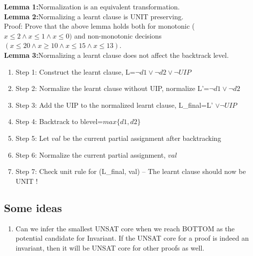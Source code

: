 \documentclass[a4paper,conference]{llncs}
\begin{document}
\textbf{Lemma 1:}Normalization is an equivalent transformation. \\ 
\textbf{Lemma 2:}Normalizing a learnt clause is UNIT preserving. \\
Proof: Prove that the above lemma holds both for monotonic ($x \leq 2 \land x \leq 1 
\land x \leq 0)$ and non-monotonic decisions $(x \leq 20 \land x \geq 10 \land
x \leq 15 \land x \leq 13)$. \\
\textbf{Lemma 3:}Normalizing a learnt clause does not affect the backtrack
level. \\
\begin{enumerate}
\item Step 1: Construct the learnt clause, L=${\neg{d1} \lor \neg{d2} \lor \neg{UIP}}$
\item Step 2: Normalize the learnt clause without UIP, normalize L'=${\neg{d1} \lor \neg{d2}}$
\item Step 3: Add the UIP to the normalized learnt clause, L\_final=L' $\lor \neg{UIP}$
\item Step 4: Backtrack to blevel=$max\{d1, d2\}$
\item Step 5: Let $val$ be the current partial assignment after backtracking
\item Step 6: Normalize the current partial assignment, $val$
\item Step 7: Check unit rule for (L\_final, val) -- The learnt clause should now be UNIT !
\end{enumerate}

\subsection{Some ideas}
\begin{enumerate}
\item Can we infer the smallest UNSAT core when we reach BOTTOM 
as the potential candidate for Invariant. If the UNSAT core for 
a proof is indeed an invariant, then it will be UNSAT core for other proofs 
as well. 
\end{enumerate}
\end{document}
